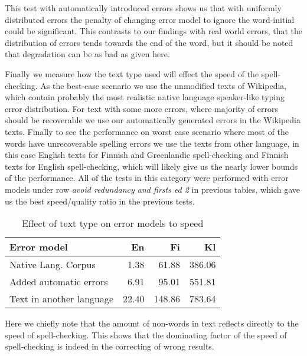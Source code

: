 \documentclass[11pt]{article}
\begin{document}
This test with automatically introduced errors shows us that with uniformly
distributed errors the penalty of changing error model to ignore the
word-initial could be significant. This contrasts to our findings with real
world errors, that the distribution of errors tends towards the end of the word,
but it should be noted that degradation can be as bad as given here.

Finally we measure how the text type used will effect the speed of the
spell-checking. As the best-case scenario we use the unmodified texts of
Wikipedia, which contain probably the most realistic native language
speaker-like typing error distribution. For text with some more errors, where
majority of errors should be recoverable we use our automatically generated
errors in the Wikipedia texts. Finally to see the performance on worst case
scenario where most of the words have unrecoverable spelling errors we use the
texts from other language, in this case English texts for Finnish and 
Greenlandic spell-checking and Finnish texts for English spell-checking, which
will likely give us the nearly lower bounds of the performance. All of the
tests in this category were performed with error models under row
\emph{avoid redundancy and firsts ed 2} in previous tables, which gave us 
the best speed/quality ratio in the previous tests.

\begin{table}[h]
\begin{center}
\begin{scriptsize}
\begin{tabular}{|l|rrr|}
\hline
\bf Error model & \bf En & \bf Fi & \bf Kl  \\ 
\hline
Native Lang. Corpus &
1.38&61.88&386.06
\\
Added automatic errors &
6.91&95.01&551.81
\\
Text in another language &
22.40&148.86&783.64
\\
\hline
\end{tabular}
\end{scriptsize}
\end{center}
\caption{\label{table:language-vs-text-type} Effect of text type on
error models to speed}
\end{table}

Here we chiefly note that the amount of non-words in text reflects directly to
the speed of spell-checking. This shows that the dominating factor of the
speed of spell-checking is indeed in the correcting of wrong results.
\end{document}
